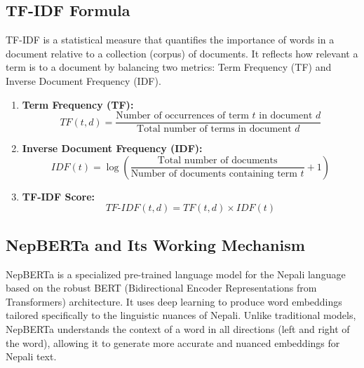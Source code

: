 \subsection{TF-IDF Formula}
TF-IDF is a statistical measure that quantifies the importance of words in a document relative to a collection (corpus) of documents. It reflects how relevant a term is to a document by balancing two metrics: Term Frequency (TF) and Inverse Document Frequency (IDF).
\begin{enumerate}
    \item \textbf{Term Frequency (TF):}
    \[
    TF(t, d) = \frac{\text{Number of occurrences of term } t \text{ in document } d}{\text{Total number of terms in document } d}
    \]

    \item \textbf{Inverse Document Frequency (IDF):}
    \[
    IDF(t) = \log \left( \frac{\text{Total number of documents}}{\text{Number of documents containing term } t} + 1 \right)
    \]

    \item \textbf{TF-IDF Score:}
    \[
    TF\text{-}IDF(t, d) = TF(t, d) \times IDF(t)
    \]
\end{enumerate}

\subsection{NepBERTa and Its Working Mechanism}
NepBERTa is a specialized pre-trained language model for the Nepali language based on the robust BERT (Bidirectional Encoder Representations from Transformers) architecture. It uses deep learning to produce word embeddings tailored specifically to the linguistic nuances of Nepali. Unlike traditional models, NepBERTa understands the context of a word in all directions (left and right of the word), allowing it to generate more accurate and nuanced embeddings for Nepali text.

